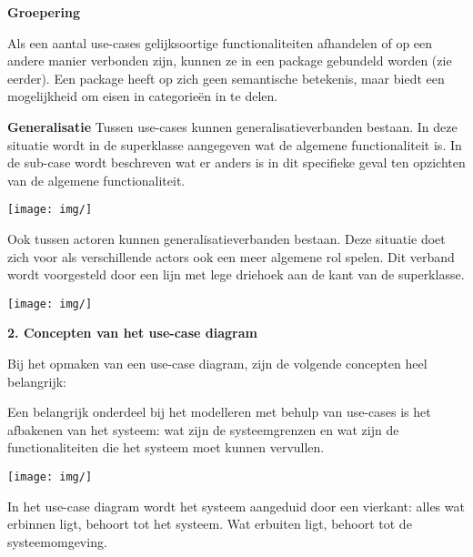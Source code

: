 \textbf{Groepering}

Als een aantal use-cases gelijksoortige functionaliteiten afhandelen of op een andere manier verbonden zijn, kunnen ze in een package gebundeld worden (zie eerder).
Een package heeft op zich geen semantische betekenis, maar biedt een mogelijkheid om eisen in categorieën in te delen.

\textbf{Generalisatie}
Tussen use-cases kunnen generalisatieverbanden bestaan. In deze situatie wordt in de superklasse aangegeven wat de algemene functionaliteit is. In de sub-case wordt beschreven wat er anders is in dit specifieke geval ten opzichten van de algemene functionaliteit.


\begin{center}
\texttt{[image: img/]}%
\label{labelname}%
\end{center}

Ook tussen actoren kunnen generalisatieverbanden bestaan. Deze situatie doet zich voor als verschillende actors ook een meer algemene rol spelen. Dit verband wordt voorgesteld door een lijn met lege driehoek aan de kant van de superklasse.


\begin{center}
\texttt{[image: img/]}%
\label{labelname}%
\end{center}

\textbf{2. Concepten van het use-case diagram}

Bij het opmaken van een use-case diagram, zijn de volgende concepten heel belangrijk:


Een belangrijk onderdeel bij het modelleren met behulp van use-cases is het afbakenen van het systeem: wat zijn de systeemgrenzen en wat zijn de functionaliteiten die het systeem moet kunnen vervullen.


\begin{center}
\texttt{[image: img/]}%
\label{labelname}%
\end{center}

In het use-case diagram wordt het systeem aangeduid door een vierkant: alles wat erbinnen ligt, behoort tot het systeem. Wat erbuiten ligt, behoort tot de systeemomgeving.

